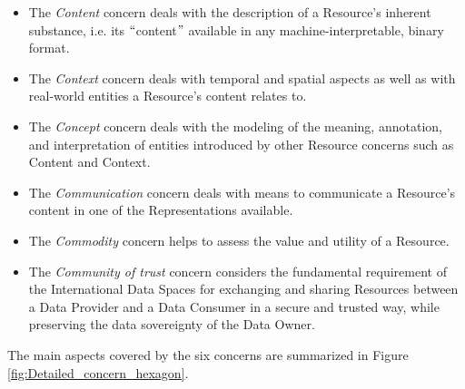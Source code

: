 \begin{itemize}
	\item The \textit{Content} concern deals with the description of a Resource’s inherent substance, i.e. its $``$content$"$  available in any machine-interpretable, binary format. 

	\item The \textit{Context} concern deals with temporal and spatial aspects as well as with real-world entities a Resource’s content relates to. 

	\item The \textit{Concept} concern deals with the modeling of the meaning, annotation, and interpretation of entities introduced by other Resource concerns such as Content and Context. 

	\item The \textit{Communication} concern deals with means to communicate a Resource’s content in one of the Representations available. 

	\item The \textit{Commodity }concern helps to assess the value and utility of a Resource. 

	\item The \textit{Community of trust} concern considers the fundamental requirement of the International Data Spaces for exchanging and sharing Resources between a Data Provider and a Data Consumer in a secure and trusted way, while preserving the data sovereignty of the Data Owner.

\end{itemize}

The main aspects covered by the six concerns are summarized in Figure \ref{fig:Detailed_concern_hexagon}.



